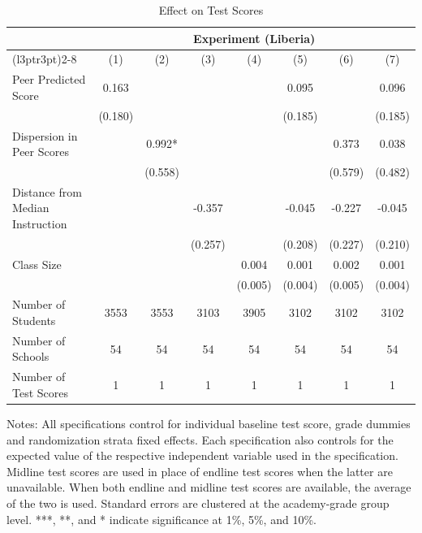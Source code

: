 \begin{table}[!h]
\centering\centering\centering
\caption{Effect on Test Scores}
\centering
\begin{threeparttable}
\fontsize{10}{12}\selectfont
\begin{tabular}[t]{lccccccc}
\toprule
\multicolumn{1}{c}{ } & \multicolumn{7}{c}{Experiment (Liberia)} \\
\cmidrule(l{3pt}r{3pt}){2-8}
  & (1) & (2) & (3) & (4) & (5) & (6) & (7)\\
\midrule
Peer Predicted Score & 0.163 &  &  &  & 0.095 &  & 0.096\\
 & (0.180) &  &  &  & (0.185) &  & (0.185)\\
Dispersion in Peer Scores &  & 0.992* &  &  &  & 0.373 & 0.038\\
 &  & (0.558) &  &  &  & (0.579) & (0.482)\\
Distance from Median Instruction &  &  & -0.357 &  & -0.045 & -0.227 & -0.045\\
 &  &  & (0.257) &  & (0.208) & (0.227) & (0.210)\\
Class Size &  &  &  & 0.004 & 0.001 & 0.002 & 0.001\\
 &  &  &  & (0.005) & (0.004) & (0.005) & (0.004)\\
\hline
\midrule
Number of Students & 3553 & 3553 & 3103 & 3905 & 3102 & 3102 & 3102\\
Number of Schools & 54 & 54 & 54 & 54 & 54 & 54 & 54\\
Number of Test Scores & 1 & 1 & 1 & 1 & 1 & 1 & 1\\
\bottomrule
\end{tabular}
\begin{tablenotes}[para]
\item Notes:
                      All specifications control for individual baseline test score,
                        grade dummies and randomization strata fixed effects. Each specification
                        also controls for the expected value of the respective independent variable
                         used in the specification. Midline test scores are used in place of endline test scores when the latter are unavailable. 
                         When both endline and midline test scores are available, the average of the two is used. 
                         Standard errors are clustered at the academy-grade
                          group level. ***, **, and * indicate significance at 1\%, 5\%, and 10\%.
\end{tablenotes}
\end{threeparttable}
\end{table}
